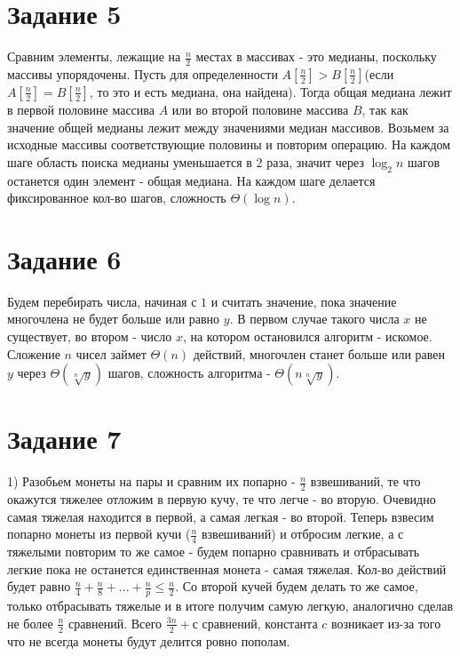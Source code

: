 \documentclass[a4paper,12pt]{article}
\begin{document}
\section*{Задание 5}
\hspace{0.5cm} 
Сравним элементы, лежащие на $\frac{n}{2}$ местах в массивах - это медианы, поскольку массивы упорядочены. Пусть для определенности $A[\frac{n}{2}]>B[\frac{n}{2}]$(если $A[\frac{n}{2}]=B[\frac{n}{2}]$, то это и есть медиана, она найдена). Тогда общая медиана лежит в первой половине массива $A$ или во второй половине массива $B$, так как значение общей медианы лежит между значениями медиан массивов. Возьмем за исходные массивы соответствующие половины и повторим операцию. На каждом шаге область поиска медианы уменьшается в $2$ раза, значит через $\log_{2}{n}$ шагов останется один элемент - общая медиана. На каждом шаге делается фиксированное кол-во шагов, сложность $\Theta(\log{n})$.

\section*{Задание 6}
\hspace{0.5cm} 
Будем перебирать числа, начиная с $1$ и считать значение, пока значение многочлена не будет больше или равно $y$. В первом случае такого числа $x$ не существует, во втором - число $x$, на котором остановился алгоритм - искомое. Сложение $n$ чисел займет $\Theta(n)$ действий, многочлен станет больше или равен $y$ через $\Theta(\sqrt[n]{y})$ шагов, сложность алгоритма - $\Theta(n\sqrt[n]{y})$.

\section*{Задание 7}
\hspace{0.5cm}
1) Разобьем монеты на пары и сравним их попарно - $\frac{n}{2}$ взвешиваний, те что окажутся тяжелее отложим в первую кучу, те что легче - во вторую. Очевидно самая тяжелая находится в первой, а самая легкая - во второй. Теперь взвесим попарно монеты из первой кучи ($\frac{n}{4}$ взвешиваний) и отбросим легкие, а с тяжелыми повторим то же самое - будем попарно сравнивать и отбрасывать легкие пока не останется единственная монета - самая тяжелая. Кол-во действий будет равно $\frac{n}{4}+\frac{n}{8}+...+\frac{n}{p}\leq\frac{n}{2}$. Со второй кучей будем делать то же самое, только отбрасывать тяжелые и в итоге получим самую легкую, аналогично сделав не более $\frac{n}{2}$ сравнений. Всего $\frac{3n}{2}+с$ сравнений, константа $c$ возникает из-за того что не всегда монеты будут делится ровно пополам.
\end{document}

